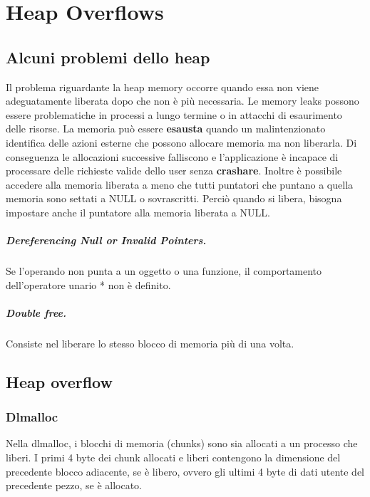 \chapter{Heap Overflows}

\section{Alcuni problemi dello heap}

Il problema riguardante la heap memory occorre quando essa non viene adeguatamente
liberata dopo che non è più necessaria. Le memory leaks possono essere problematiche
in processi a lungo termine
o in attacchi di esaurimento delle risorse. La memoria può
essere \textbf{esausta} quando un malintenzionato identifica delle azioni esterne
che possono allocare memoria ma non liberarla. Di conseguenza le allocazioni successive
falliscono e l'applicazione è incapace di processare delle richieste valide dello user
senza \textbf{crashare}. Inoltre è possibile accedere alla memoria liberata a meno
che tutti puntatori che puntano a quella memoria sono settati a NULL o sovrascritti.
Perciò quando si libera, bisogna impostare anche il puntatore alla memoria liberata
a NULL.

\paragraph{Dereferencing Null or Invalid Pointers.} Se l'operando non punta a un
oggetto o una funzione, il comportamento dell'operatore unario * non è definito.

\paragraph{Double free.} Consiste nel liberare lo stesso blocco di memoria più di una volta.

\newpage

\section{Heap overflow}

\subsection{Dlmalloc}

Nella dlmalloc, i blocchi di memoria (chunks) sono sia allocati a un processo che liberi.
I primi 4 byte dei chunk allocati e liberi contengono la dimensione del precedente
blocco adiacente, se è libero, ovvero gli ultimi 4 byte di dati utente del
precedente pezzo, se è allocato.


